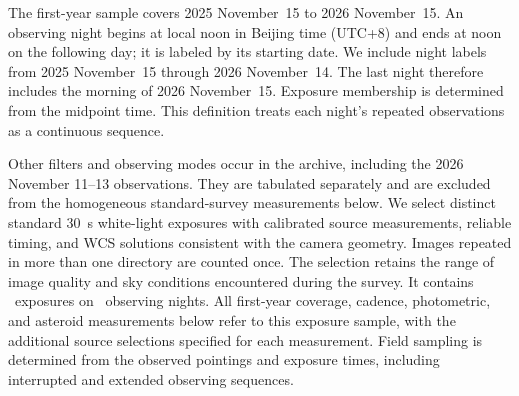 The first-year sample covers 2025 November~15 to 2026 November~15.
An observing night begins at local noon in Beijing time (UTC+8) and
ends at noon on the following day; it is labeled by its starting
date. We include night labels from 2025 November~15 through 2026
November~14. The last night therefore includes the morning of 2026
November~15. Exposure membership is determined from the midpoint
time. This definition treats each night's repeated observations as
a continuous sequence.

Other filters and observing modes occur in the archive, including the
2026 November 11--13 observations. They are tabulated separately and
are excluded from the homogeneous standard-survey measurements below.
We select distinct standard 30~s white-light exposures with calibrated
source measurements, reliable timing, and WCS solutions consistent
with the camera geometry. Images repeated in more than one directory
are counted once. The selection retains the range of image quality
and sky conditions encountered during the survey. It contains
\yrNexp\ exposures on \yrNnight\ observing nights. All first-year
coverage, cadence, photometric, and asteroid measurements below
refer to this exposure sample, with the additional source selections
specified for each measurement. Field sampling is determined from
the observed pointings and exposure times, including interrupted
and extended observing sequences.
